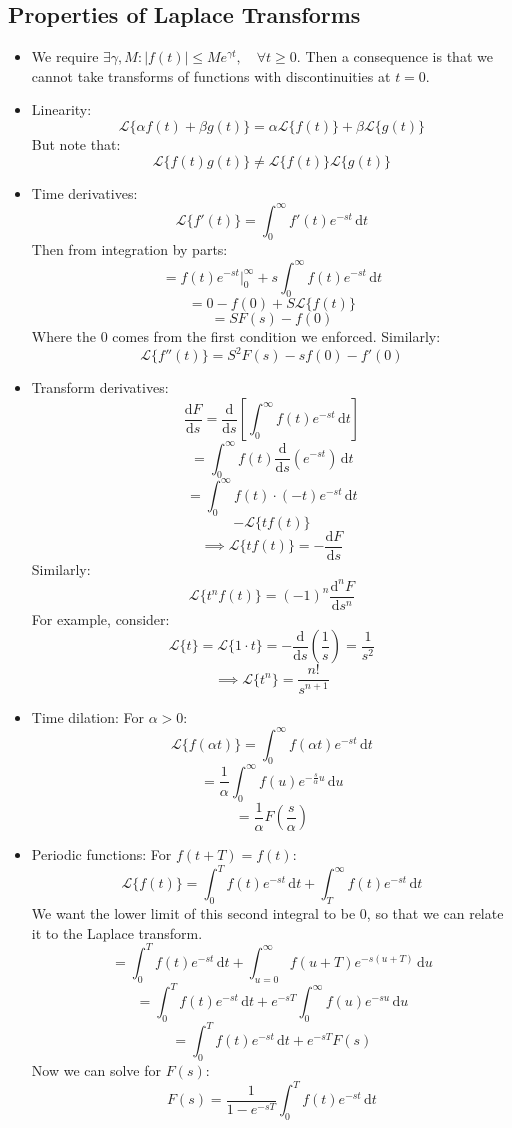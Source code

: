 \documentclass[12pt]{article}
\newcommand{\df}[2]{\frac{\text{d}#1}{\text{d}#2}}
\newcommand{\lapl}[1]{\mathcal{L}\{#1\}}
\begin{document}
\subsection{Properties of Laplace Transforms}
\begin{itemize}
    \item We require \(\exists \gamma,M:|f(t)|\leq Me^{\gamma t},\quad \forall t\geq0\). Then a consequence is that we cannot take transforms of functions with discontinuities at \(t=0\).
    \item Linearity:
    \[\lapl{\alpha f(t)+\beta g(t)}=\alpha\lapl{f(t)}+\beta\lapl{g(t)}\]
    But note that:
    \[\lapl{f(t)g(t)}\ne\lapl{f(t)}\lapl{g(t)}\]
    \item Time derivatives:
    \[\lapl{f'(t)}=\int^\infty_0f'(t)e^{-st}\,\text{d}t\]
    Then from integration by parts:
    \[=f(t)e^{-st}\bigl|^\infty_0+s\int^\infty_0f(t)e^{-st}\,\text{d}t\]
    \[=0-f(0)+S\lapl{f(t)}\]
    \[=SF(s)-f(0)\]
    Where the \(0\) comes from the first condition we enforced. Similarly:
    \[\lapl{f''(t)}=S^2F(s)-sf(0)-f'(0)\]
    \item Transform derivatives:
    \[\df{F}{s}=\df{}{s}\left[\int^\infty_0f(t)e^{-st}\,\text{d}t\right]\]
    \[=\int^\infty_0f(t)\df{}{s}(e^{-st})\,\text{d}t\]
    \[=\int^\infty_0f(t)\cdot(-t)e^{-st}\,\text{d}t\]
    \[-\lapl{tf(t)}\]
    \[\implies \lapl{tf(t)}=-\df{F}{s}\]
    Similarly:
    \[\lapl{t^nf(t)}=(-1)^n\df{^nF}{s^n}\]
    For example, consider:
    \[\lapl{t}=\lapl{1\cdot t}=-\df{}{s}\left(\frac{1}{s}\right)=\frac{1}{s^2}\]
    \[\implies \lapl{t^n}=\frac{n!}{s^{n+1}}\]
    \item Time dilation: For \(\alpha>0\):
    \[\lapl{f(\alpha t)}=\int^\infty_0f(\alpha t)e^{-st}\,\text{d}t\]
    \[=\frac{1}{\alpha}\int^\infty_0f(u)e^{-\frac{s}{\alpha}u}\,\text{d}u\]
    \[=\frac{1}{\alpha}F\left(\frac{s}{\alpha}\right)\]
    \item Periodic functions: For \(f(t+T)=f(t)\):
    \[\lapl{f(t)}=\int^T_0f(t)e^{-st}\,\text{d}t+\int^\infty_Tf(t)e^{-st}\,\text{d}t\]
    We want the lower limit of this second integral to be \(0\), so that we can relate it to the Laplace transform.
    \[=\int^T_0f(t)e^{-st}\,\text{d}t+\int^\infty_{u=0}f(u+T)e^{-s(u+T)}\,\text{d}u\]
    \[=\int^T_0f(t)e^{-st}\,\text{d}t+e^{-sT}\int^\infty_0f(u)e^{-su}\,\text{d}u\]
    \[=\int^T_0f(t)e^{-st}\,\text{d}t+e^{-sT}F(s)\]
    Now we can solve for \(F(s)\):
    \[F(s)=\frac{1}{1-e^{-sT}}\int^T_0f(t)e^{-st}\,\text{d}t\]
\end{itemize}
\end{document}
